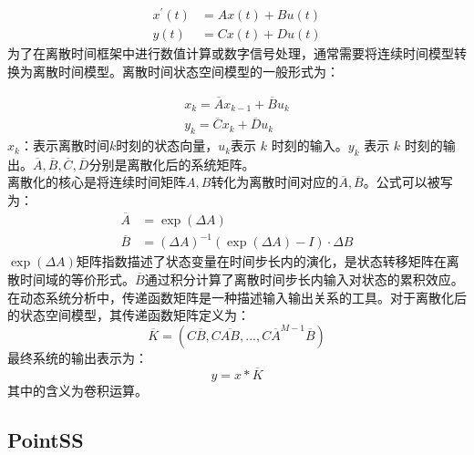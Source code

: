 \documentclass[preprint,12pt]{elsarticle}
\begin{document}
\begin{equation}\label{ssm1}
	\begin{aligned}
		x^{\prime}(t) &= Ax(t) + Bu(t) \\
		y(t) &= Cx(t) + Du(t)
	\end{aligned}
\end{equation}
为了在离散时间框架中进行数值计算或数字信号处理，通常需要将连续时间模型转换为离散时间模型。离散时间状态空间模型的一般形式为：

\begin{equation}
	\begin{aligned}x_{k}=\overline{A}{x}_{k-1}+\overline{{B}}{u}_{k}\\
	{y}_{k}=\overline{{C}}{x}_{k}+\overline{{D}}{u}_{k}
\end{aligned}
	\end{equation}
${x}_k$：表示离散时间$k$时刻的状态向量，${u}_k$表示
	 $k$ 时刻的输入。${y}_k$ 表示 $k$ 时刻的输出。$\overline{{A}},\overline{{B}},\overline{{C}},\overline{{D}}$分别是离散化后的系统矩阵。\\
	 
	离散化的核心是将连续时间矩阵${A},{B}$转化为离散时间对应的$\overline{{A}},\overline{{B}}$。公式可以被写为：
\begin{equation}
	\begin{aligned}
		\overline{{A}} &= \exp(\Delta {A}) \\
		\overline{{B}} &= (\Delta {A})^{-1}(\exp(\Delta {A}) - {I}) \cdot \Delta {B}
	\end{aligned}
\end{equation}
$\exp(\Delta {A})$矩阵指数描述了状态变量在时间步长内的演化，是状态转移矩阵在离散时间域的等价形式。$\overline{{B}}$通过积分计算了离散时间步长内输入对状态的累积效应。\\

在动态系统分析中，传递函数矩阵是一种描述输入输出关系的工具。对于离散化后的状态空间模型，其传递函数矩阵定义为：
\begin{equation}\overline{K}=(C\overline{{B}},C\overline{{AB}},...,C\overline{{A}}^{M-1}\overline{{B}})\end{equation}
最终系统的输出表示为：
\begin{equation}{y}={x}*\overline{K}\end{equation}
其中\text{*}的含义为卷积运算。\\




\subsection{PointSS}
\end{document}
